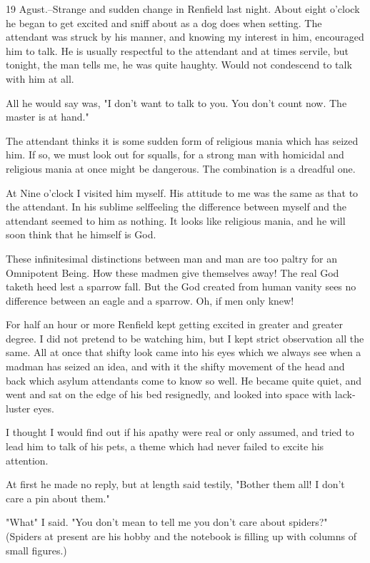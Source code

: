 19 Agust.--Strange and sudden change in Renfield last night. About eight o'clock he began to get excited and sniff about as a dog does when setting. The attendant was struck by his manner, and knowing my interest in him, encouraged him to talk. He is usually respectful to the attendant and at times servile, but tonight, the man tells me, he was quite haughty. Would not condescend to talk with him at all. 

All he would say was, "I don't want to talk to you. You don't count now. The master is at hand." 

The attendant thinks it is some sudden form of religious mania which has seized him. If so, we must look out for squalls, for a strong man with homicidal and religious mania at once might be dangerous. The combination is a dreadful one. 

At Nine o'clock I visited him myself. His attitude to me was the same as that to the attendant. In his sublime selffeeling the difference between myself and the attendant seemed to him as nothing. It looks like religious mania, and he will soon think that he himself is God. 

These infinitesimal distinctions between man and man are too paltry for an Omnipotent Being. How these madmen give themselves away! The real God taketh heed lest a sparrow fall. But the God created from human vanity sees no difference between an eagle and a sparrow. Oh, if men only knew! 

For half an hour or more Renfield kept getting excited in greater and greater degree. I did not pretend to be watching him, but I kept strict observation all the same. All at once that shifty look came into his eyes which we always see when a madman has seized an idea, and with it the shifty movement of the head and back which asylum attendants come to know so well. He became quite quiet, and went and sat on the edge of his bed resignedly, and looked into space with lack-luster eyes. 

I thought I would find out if his apathy were real or only assumed, and tried to lead him to talk of his pets, a theme which had never failed to excite his attention. 

At first he made no reply, but at length said testily, "Bother them all! I don't care a pin about them." 

"What" I said. "You don't mean to tell me you don't care about spiders?" (Spiders at present are his hobby and the notebook is filling up with columns of small figures.) 

